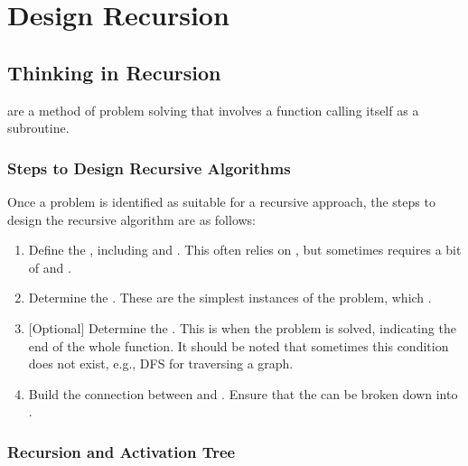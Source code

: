 \chapter{Design Recursion}\label{chap:recursive_algorithm}
\section{Thinking in Recursion}
{\color{blue}{Recursive algorithms}} are a method of problem solving that involves a function calling itself as a subroutine.
\subsection{Steps to Design Recursive Algorithms}\label{subsec:steps_to_design_recursive_algorithms}
Once a problem is identified as suitable for a recursive approach, the steps to design the recursive algorithm are as follows:
\begin{enumerate}
	\item Define the {\color{blue}{function signature}}, including {\color{blue}{parameters}} and {\color{blue}{return value}}. This often relies on {\color{blue}{experience}}, but sometimes requires a bit of {\color{blue}{creativity}} and {\color{blue}{imagination}}.
	\item Determine the {\color{blue}{base cases}}. These are the simplest instances of the problem, which {\color{blue}{can be solved directly without further recursion}}.
	\item {[Optional]} Determine the {\color{blue}{termination condition of the whole problem}}. This is when the problem is solved, indicating the end of the whole function. It should be noted that sometimes this condition does not exist, e.g., DFS for traversing a graph.
	\item Build the connection between {\color{blue}{larger problem}} and {\color{blue}{smaller sub-problems}}. Ensure that the {\color{blue}{original problem}} can be broken down into {\color{blue}{base cases}}.
\end{enumerate}

\subsection{Recursion and Activation Tree}
{}\\

